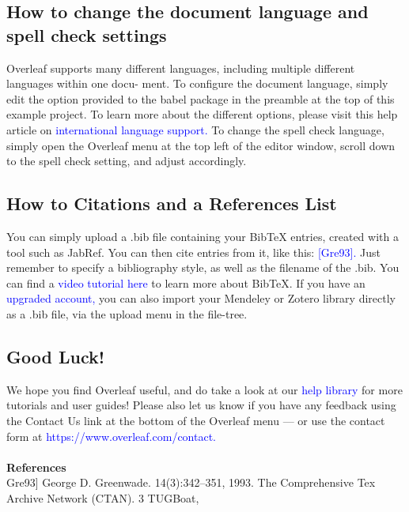\documentclass{article}
\begin{document}
	\subsection{How to change the document language and spell check settings}
	Overleaf supports many different languages, including multiple different languages within one docu-
	ment.
	To configure the document language, simply edit the option provided to the babel package in the
	preamble at the top of this example project. To learn more about the different options, please visit
	this help article on 
	\textcolor{blue}{international language support.}
	To change the spell check language, simply open the Overleaf menu at the top left of the editor
	window, scroll down to the spell check setting, and adjust accordingly.
	\subsection{How to Citations and a References List}
	You can simply upload a .bib file containing your BibTeX entries, created with a tool such as JabRef.
	You can then cite entries from it, like this: 
	\textcolor{blue}{[Gre93].} Just remember to specify a bibliography style, as
	well as the filename of the .bib. You can find a 
	\textcolor{blue}{video tutorial here} to learn more about BibTeX.
	If you have an 
	\textcolor{blue}{upgraded account,} you can also import your Mendeley or Zotero library directly as
	a .bib file, via the upload menu in the file-tree.
	\subsection{Good Luck!}
	We hope you find Overleaf useful, and do take a look at our 
	\textcolor{blue}{help library}
	 for more tutorials and user
	guides! Please also let us know if you have any feedback using the Contact Us link at the bottom of
	the Overleaf menu — or use the contact form at 
	\textcolor{blue}{https://www.overleaf.com/contact.}
	\\
	\\\textbf{References}
	\\
	Gre93] George D. Greenwade.
	14(3):342–351, 1993.
	The Comprehensive Tex Archive Network (CTAN).
	3
	TUGBoat,
	
		
\end{document}

